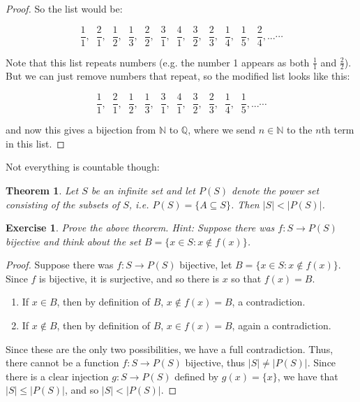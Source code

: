 \documentclass[a4paper,12pt,dvipsnames]{book}
\newtheorem{theorem}{Theorem}
\newtheorem{exercise}{Exercise}
\numberwithin{theorem}{chapter}
\theoremstyle{remark}
\begin{document}
\begin{proof}
So the list would be:

\[
\frac{1}{1}, \;\; \frac{2}{1}, \;\; \frac{1}{2}, \;\; \frac{1}{3}, \;\; \frac{2}{2}, \;\; \frac{3}{1}, \;\; \frac{4}{1}, \;\; \frac{3}{2}, \;\; \frac{2}{3}, \;\; \frac{1}{4}, \;\; \frac{1}{5}, \;\; \frac{2}{4},...\cdots \]

Note that this list repeats numbers (e.g. the number 1 appears as both $\frac{1}{1}$ and $\frac{2}{2}$). But we can just remove numbers that repeat, so the modified list looks like this:

\[
\frac{1}{1}, \;\; \frac{2}{1}, \;\; \frac{1}{2}, \;\; \frac{1}{3},  \;\; \frac{3}{1}, \;\; \frac{4}{1}, \;\; \frac{3}{2}, \;\; \frac{2}{3}, \;\; \frac{1}{4}, \;\; \frac{1}{5},...\cdots \]

and now this gives a bijection from $\mathbb{N}$ to $\mathbb{Q}$, where we send $n\in\mathbb{N}$ to the $n$th term in this list. 

\end{proof}

Not everything is countable though:

\begin{theorem}
Let $S$ be an infinite set and let $P(S)$ denote the {\it power set} consisting of the subsets of $S$, i.e. $P(S)= \{A\subseteq S\}$. Then $|S|<|P(S)|$. 
\end{theorem}

\begin{exercise}
Prove the above theorem. {\it Hint: Suppose there was $f:S\rightarrow P(S)$ bijective and think about the set $B=\{x\in S: x\not\in f(x)\}$.}
\end{exercise}

\begin{solution}
\begin{proof}
Suppose there was $f:S\rightarrow P(S)$ bijective, let $B=\{x\in S: x\not\in f(x)\}$. Since $f$ is bijective, it is surjective, and so there is $x$ so that $f(x)=B$. 
\begin{enumerate}
\item If $x\in B$, then by definition of $B$, $x\not\in f(x)=B$, a contradiction.
\item If $x\not\in B$, then by definition of $B$, $x\in f(x)=B$, again a contradiction.
\end{enumerate}
Since these are the only two possibilities, we have a full contradiction. Thus, there cannot be a function $f:S\rightarrow P(S)$ bijective, thus $|S|\neq |P(S)|$. Since there is a clear injection $g:S\rightarrow P(S)$ defined by $g(x)=\{x\}$, we have that $|S|\leq |P(S)|$, and so $|S|<|P(S)|$. 
\end{proof}
\end{solution}
\end{document}
